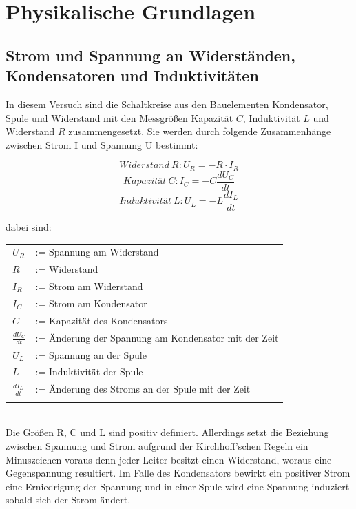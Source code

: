 \section{Physikalische Grundlagen}
\subsection{Strom und Spannung an Widerständen, Kondensatoren und Induktivitäten}
In diesem Versuch sind die Schaltkreise aus den Bauelementen Kondensator, Spule und Widerstand mit den Messgrößen Kapazität \(C\), Induktivität \(L\) und Widerstand \(R\) zusammengesetzt. Sie werden durch folgende Zusammenhänge zwischen Strom I und Spannung U bestimmt:

\begin{equation}
\label{1}
Widerstand\ R: U_{R}=-R\cdot I_{R}
\end{equation}
\begin{equation}
\label{2}
Kapazität\ C: I_C=-C\frac{dU_C}{dt}
\end{equation}
\begin{equation}
\label{3}
Induktivität\ L: U_{L}=-L\frac{dI_{L}}{dt}
\end{equation}

dabei sind: \vspace{0,5cm}

\begin{tabular}{l l}
\(\ U_{R}\) & := Spannung am Widerstand\\
\(\ R\)		& := Widerstand\\
\(\ I_{R}\)	& := Strom am Widerstand\\
\(\ I_{C}\)	& := Strom am Kondensator\\
\(\ C\)		& := Kapazität des Kondensators\\
\(\ \frac{dU_{C}}{dt}\)	& := Änderung der Spannung am Kondensator mit der Zeit\\
\(\ U_{L}\)	& := Spannung an der Spule\\
\(\ L\)		& := Induktivität der Spule\\
\(\ \frac{dI_{L}}{dt}\)	& := Änderung des Stroms an der Spule mit der Zeit\\
\vspace{0,5cm}
\end{tabular}\\

Die Größen R, C und L sind positiv definiert. Allerdings setzt die Beziehung zwischen Spannung und Strom aufgrund der Kirchhoff'schen Regeln ein Minuszeichen voraus denn jeder Leiter besitzt einen Widerstand, woraus eine Gegenspannung resultiert. Im Falle des Kondensators bewirkt ein positiver Strom eine Erniedrigung der Spannung und in einer Spule wird eine Spannung induziert sobald sich der Strom ändert.

